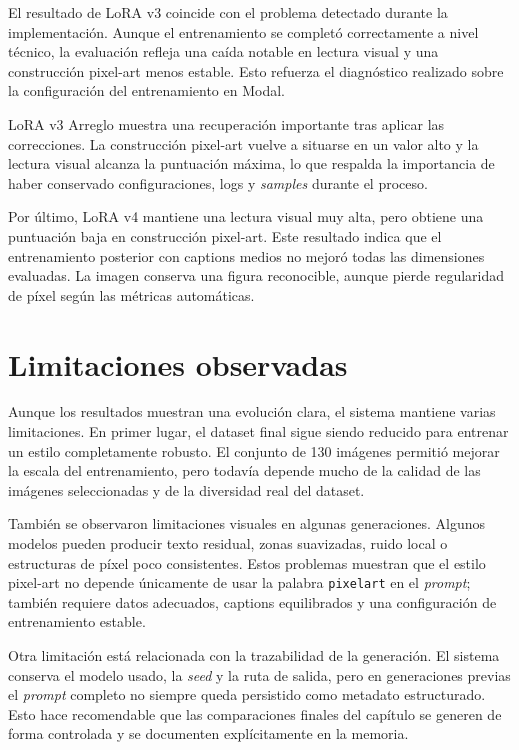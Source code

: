 \documentclass[a4paper,11pt,titlepage]{scrbook}
\begin{document}
\medskip

El resultado de LoRA v3 coincide con el problema detectado durante la implementación. Aunque el entrenamiento se completó correctamente a nivel técnico, la evaluación refleja una caída notable en lectura visual y una construcción pixel-art menos estable. Esto refuerza el diagnóstico realizado sobre la configuración del entrenamiento en Modal.

\medskip

LoRA v3 Arreglo muestra una recuperación importante tras aplicar las correcciones. La construcción pixel-art vuelve a situarse en un valor alto y la lectura visual alcanza la puntuación máxima, lo que respalda la importancia de haber conservado configuraciones, logs y \textit{samples} durante el proceso.

\medskip

Por último, LoRA v4 mantiene una lectura visual muy alta, pero obtiene una puntuación baja en construcción pixel-art. Este resultado indica que el entrenamiento posterior con captions medios no mejoró todas las dimensiones evaluadas. La imagen conserva una figura reconocible, aunque pierde regularidad de píxel según las métricas automáticas.


\section{Limitaciones observadas}

Aunque los resultados muestran una evolución clara, el sistema mantiene varias limitaciones. En primer lugar, el dataset final sigue siendo reducido para entrenar un estilo completamente robusto. El conjunto de 130 imágenes permitió mejorar la escala del entrenamiento, pero todavía depende mucho de la calidad de las imágenes seleccionadas y de la diversidad real del dataset.

\medskip

También se observaron limitaciones visuales en algunas generaciones. Algunos modelos pueden producir texto residual, zonas suavizadas, ruido local o estructuras de píxel poco consistentes. Estos problemas muestran que el estilo pixel-art no depende únicamente de usar la palabra \texttt{pixelart} en el \textit{prompt}; también requiere datos adecuados, captions equilibrados y una configuración de entrenamiento estable.

\medskip

Otra limitación está relacionada con la trazabilidad de la generación. El sistema conserva el modelo usado, la \textit{seed} y la ruta de salida, pero en generaciones previas el \textit{prompt} completo no siempre queda persistido como metadato estructurado. Esto hace recomendable que las comparaciones finales del capítulo se generen de forma controlada y se documenten explícitamente en la memoria.
\end{document}
